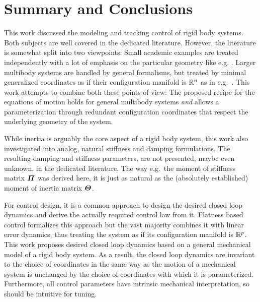 \chapter{Summary and Conclusions}

This work discussed the modeling and tracking control of rigid body systems.
Both subjects are well covered in the dedicated literature.
However, the literature is somewhat split into two viewpoints:
Small academic examples are treated independently with a lot of emphasis on the particular geometry like e.g. \cite{Marsden:MechanicsAndSymmetry}.
Larger multibody systems are handled by general formalisms, but treated by minimal generalized coordinates as if their configuration manifold is $\mathbb{R}^n$ as in e.g.\ \cite{Schwertassek:MultibodySystems}.
This work attempts to combine both these points of view:
The proposed recipe for the equations of motion holds for general multibody systems \textit{and} allows a parameterization through redundant configuration coordinates that respect the underlying geometry of the system.

While inertia is arguably the core aspect of a rigid body system, this work also investigated into analog, natural stiffness and damping formulations.
The resulting damping and stiffness parameters, are not presented, maybe even unknown, in the dedicated literature.
The way e.g.\ the moment of stiffness matrix $\bodyMOS{}{}$ was derived here, it is just as natural as the (absolutely established) moment of inertia matrix $\bodyMOI{}{}$.

For control design, it is a common approach to design the desired closed loop dynamics and derive the actually required control law from it.
Flatness based control formalizes this approach but the vast majority combines it with linear error dynamics, thus treating the system as if its configuration manifold is $\mathbb{R}^p$.
This work proposes desired closed loop dynamics based on a general mechanical model of a rigid body system.
As a result, the closed loop dynamics are invariant to the choice of coordinates in the same way as the motion of a mechanical system is unchanged by the choice of coordinates with which it is parameterized.
Furthermore, all control parameters have intrinsic mechanical interpretation, so should be intuitive for tuning.
 
